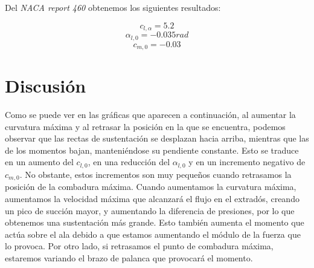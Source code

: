 \documentclass[10pt, a4paper]{article}
\begin{document}
Del \textit{NACA report 460} obtenemos los siguientes resultados:

\[ c_{l,\alpha}=5.2 \]
\[ \alpha_{l,0} = -0.035 rad \]
\[ c_{m,0} = -0.03 \]

\section{Discusión}

Como se puede ver en las gráficas que aparecen a continuación, al aumentar la curvatura máxima y al retrasar la posición en la que se encuentra, podemos observar que las rectas de sustentación se desplazan hacia arriba, mientras que las de los momentos bajan, manteniéndose su pendiente constante. Esto se traduce en un aumento del $c_{l,0}$, en una reducción del $\alpha_{l,0}$ y en un incremento negativo de $c_{m,0}$. No obstante, estos incrementos son muy pequeños cuando retrasamos la posición de la combadura máxima.
Cuando aumentamos la curvatura máxima, aumentamos la velocidad máxima que alcanzará el flujo en el extradós, creando un pico de succión mayor, y aumentando la diferencia de presiones, por lo que obtenemos una sustentación más grande. Esto también aumenta el momento que actúa sobre el ala debido a que estamos aumentando el módulo de la fuerza que lo provoca. Por otro lado, si retrasamos el punto de combadura máxima, estaremos variando el brazo de palanca que provocará el momento.
\end{document}
